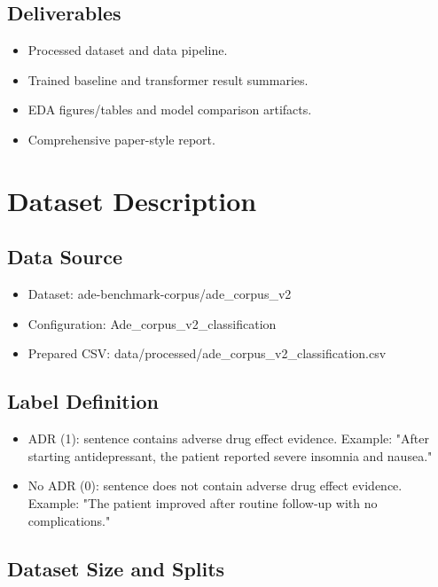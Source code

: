 \documentclass[11pt]{article}
\begin{document}
\subsection{Deliverables}

\begin{itemize}
  \item Processed dataset and data pipeline.
  \item Trained baseline and transformer result summaries.
  \item EDA figures/tables and model comparison artifacts.
  \item Comprehensive paper-style report.
\end{itemize}

\section{Dataset Description}

\subsection{Data Source}

\begin{itemize}
  \item Dataset: ade-benchmark-corpus/ade\_corpus\_v2
  \item Configuration: Ade\_corpus\_v2\_classification
  \item Prepared CSV: data/processed/ade\_corpus\_v2\_classification.csv
\end{itemize}

\subsection{Label Definition}

\begin{itemize}
  \item ADR (1): sentence contains adverse drug effect evidence. Example: "After starting antidepressant, the patient reported severe insomnia and nausea."
  \item No ADR (0): sentence does not contain adverse drug effect evidence. Example: "The patient improved after routine follow-up with no complications."
\end{itemize}

\subsection{Dataset Size and Splits}
\end{document}
